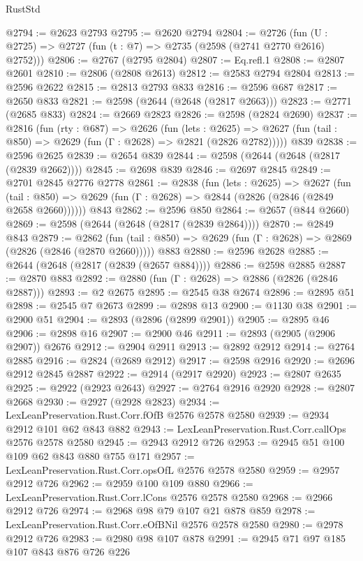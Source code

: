 \begin{lexlean}{RustStd}
\begin{coremodule}
@2794 := @2623 @2793
@2795 := @2620 @2794
@2804 := @2726 (fun (U : @2725) => @2727 (fun (t : @7) => @2735 (@2598 (@2741 @2770 @2616) @2752)))
@2806 := @2767 (@2795 @2804)
@2807 := Eq.refl.{1}
@2808 := @2807 @2601
@2810 := @2806 (@2808 @2613)
@2812 := @2583 @2794 @2804
@2813 := @2596 @2622
@2815 := @2813 @2793 @833
@2816 := @2596 @687
@2817 := @2650 @833
@2821 := @2598 (@2644 (@2648 (@2817 @2663)))
@2823 := @2771 (@2685 @833)
@2824 := @2669 @2823
@2826 := @2598 (@2824 @2690)
@2837 := @2816
    (fun (rty : @687) =>
    @2626
      (fun (lets : @2625) =>
      @2627 (fun (tail : @850) => @2629 (fun (Γ : @2628) => @2821 (@2826 @2782)))))
    @839
@2838 := @2596 @2625
@2839 := @2654 @839
@2844 := @2598 (@2644 (@2648 (@2817 (@2839 @2662))))
@2845 := @2698 @839
@2846 := @2697 @2845
@2849 := @2701 @2845 @2776 @2778
@2861 := @2838
    (fun (lets : @2625) =>
    @2627
      (fun (tail : @850) => @2629 (fun (Γ : @2628) => @2844 (@2826 (@2846 (@2849 @2658 @2660))))))
    @843
@2862 := @2596 @850
@2864 := @2657 (@844 @2660)
@2869 := @2598 (@2644 (@2648 (@2817 (@2839 @2864))))
@2870 := @2849 @843
@2879 := @2862
    (fun (tail : @850) => @2629 (fun (Γ : @2628) => @2869 (@2826 (@2846 (@2870 @2660)))))
    @883
@2880 := @2596 @2628
@2885 := @2644 (@2648 (@2817 (@2839 (@2657 @884))))
@2886 := @2598 @2885
@2887 := @2870 @883
@2892 := @2880 (fun (Γ : @2628) => @2886 (@2826 (@2846 @2887)))
@2893 := @2 @2675
@2895 := @2545 @38 @2674
@2896 := @2895 @51
@2898 := @2545 @7 @2673
@2899 := @2898 @13
@2900 := @1130 @38
@2901 := @2900 @51
@2904 := @2893 (@2896 (@2899 @2901))
@2905 := @2895 @46
@2906 := @2898 @16
@2907 := @2900 @46
@2911 := @2893 (@2905 (@2906 @2907)) @2676
@2912 := @2904 @2911
@2913 := @2892 @2912
@2914 := @2764 @2885
@2916 := @2824 (@2689 @2912)
@2917 := @2598 @2916
@2920 := @2696 @2912 @2845 @2887
@2922 := @2914 (@2917 @2920)
@2923 := @2807 @2635
@2925 := @2922 (@2923 @2643)
@2927 := @2764 @2916 @2920
@2928 := @2807 @2668
@2930 := @2927 (@2928 @2823)
@2934 := LexLeanPreservation.Rust.Corr.fOfB @2576 @2578 @2580
@2939 := @2934 @2912 @101 @62 @843 @882
@2943 := LexLeanPreservation.Rust.Corr.callOps @2576 @2578 @2580
@2945 := @2943 @2912 @726
@2953 := @2945 @51 @100 @109 @62 @843 @880 @755 @171
@2957 := LexLeanPreservation.Rust.Corr.opsOfL @2576 @2578 @2580
@2959 := @2957 @2912 @726
@2962 := @2959 @100 @109 @880
@2966 := LexLeanPreservation.Rust.Corr.lCons @2576 @2578 @2580
@2968 := @2966 @2912 @726
@2974 := @2968 @98 @79 @107 @21 @878 @859
@2978 := LexLeanPreservation.Rust.Corr.eOfBNil @2576 @2578 @2580
@2980 := @2978 @2912 @726
@2983 := @2980 @98 @107 @878
@2991 := @2945 @71 @97 @185 @107 @843 @876 @726 @226

\end{coremodule}
\end{lexlean}
